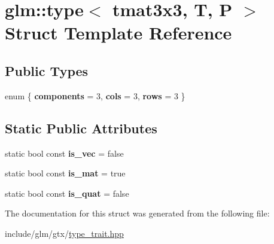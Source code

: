 \hypertarget{structglm_1_1type_3_01tmat3x3_00_01T_00_01P_01_4}{}\section{glm\+:\+:type$<$ tmat3x3, T, P $>$ Struct Template Reference}
\label{structglm_1_1type_3_01tmat3x3_00_01T_00_01P_01_4}
\subsection*{Public Types}
\begin{DoxyCompactItemize}
\item 
\mbox{\label{structglm_1_1type_3_01tmat3x3_00_01T_00_01P_01_4_a48079c89bfaed5ca1acab8116e59408e}} 
enum \{ {\bfseries components} = 3, 
{\bfseries cols} = 3, 
{\bfseries rows} = 3
 \}
\end{DoxyCompactItemize}
\subsection*{Static Public Attributes}
\begin{DoxyCompactItemize}
\item 
\mbox{\label{structglm_1_1type_3_01tmat3x3_00_01T_00_01P_01_4_ad3a93969cb5d00ea024e5defb5379f37}} 
static bool const {\bfseries is\+\_\+vec} = false
\item 
\mbox{\label{structglm_1_1type_3_01tmat3x3_00_01T_00_01P_01_4_abade54049ccd6c552a1cfe659f0b9eca}} 
static bool const {\bfseries is\+\_\+mat} = true
\item 
\mbox{\label{structglm_1_1type_3_01tmat3x3_00_01T_00_01P_01_4_aadc0f3be5741fd1f33813e2390400b3a}} 
static bool const {\bfseries is\+\_\+quat} = false
\end{DoxyCompactItemize}


The documentation for this struct was generated from the following file\+:\begin{DoxyCompactItemize}
\item 
include/glm/gtx/\hyperlink{type__trait_8hpp}{type\+\_\+trait.\+hpp}\end{DoxyCompactItemize}
